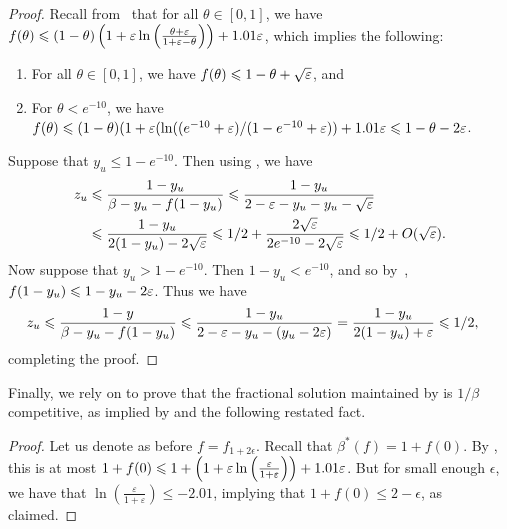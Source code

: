 \begin{proof}
Recall from~ that for all $\theta\in [0,1]$, we have $f(\theta) \leqslant (1 - \theta) \left(1+\varepsilon
\ln\left(\frac{\theta+\varepsilon}{1+\varepsilon-\theta} \right)\right) + 1.01\varepsilon$, 
which implies the following:
	\begin{enumerate}
	    \item \label{point1} For all $\theta \in [0, 1]$, we have $f(\theta) \leqslant 1 - \theta + \sqrt{\varepsilon}$, and
	    \item \label{point2} For $\theta < e^{-10}$, we have $f(\theta) \leqslant (1-\theta)(1 + \varepsilon(\ln( (e^{-10} + \varepsilon)/(1 - e^{-10} + \varepsilon)) + 1.01 \varepsilon \leqslant 1 - \theta - 2\varepsilon$.
	\end{enumerate}
Suppose that $y_u \leq 1 - e^{-10}$. Then using , we have
\begin{align*}
  z_u &\leqslant \frac{1-y_u}{\beta - y_u - f(1-y_u)} \leqslant \frac{1 - y_u}{2 - \varepsilon - y_u - y_u - \sqrt{\varepsilon}} \\
  &\leqslant \frac{ 1 - y_u} {2(1 - y_u) - 2 \sqrt{\varepsilon}} \leqslant 1/2+\frac{2\sqrt{\varepsilon}}{2e^{-10}-2\sqrt{\varepsilon}} \leqslant 1/2 + O(\sqrt{\varepsilon}).
\end{align*}
Now suppose that $y_u > 1 - e^{-10}$. Then $1 - y_u < e^{-10}$, and so by~, $f(1 - y_u) \leqslant 1 - y_u - 2\varepsilon$.
Thus we have
\begin{align*}
  z_u &\leqslant \frac{1-y}{\beta - y_u - f(1 -y_u)} \leqslant \frac{1 -y_u}{2 - \varepsilon - y_u - (y_u - 2\varepsilon)} = \frac{1-y_u}{2(1 - y_u) + \varepsilon} \leqslant 1/2,
\end{align*}
completing the proof.
\end{proof}


Finally, we rely on  to prove that the fractional solution maintained by  is $1/\beta$ competitive, as implied by  and the following restated fact.

\betafine*
\begin{proof}
	Let us denote as before $f=f_{1+2\epsilon}$.
	Recall that $\beta^*(f) = 1+f(0)$. By , this is at most $1+f(0) \leqslant 1 + \left(1+\varepsilon
	\ln\left(\frac{\varepsilon}{1+\varepsilon} \right)\right) + 1.01\varepsilon$. 
	But for small enough $\epsilon$, we have that $\ln\left(\frac{\varepsilon}{1+\varepsilon} \right) \leq  -2.01$, implying that $1+f(0) \leq 2-\epsilon$, as claimed.
\end{proof}
